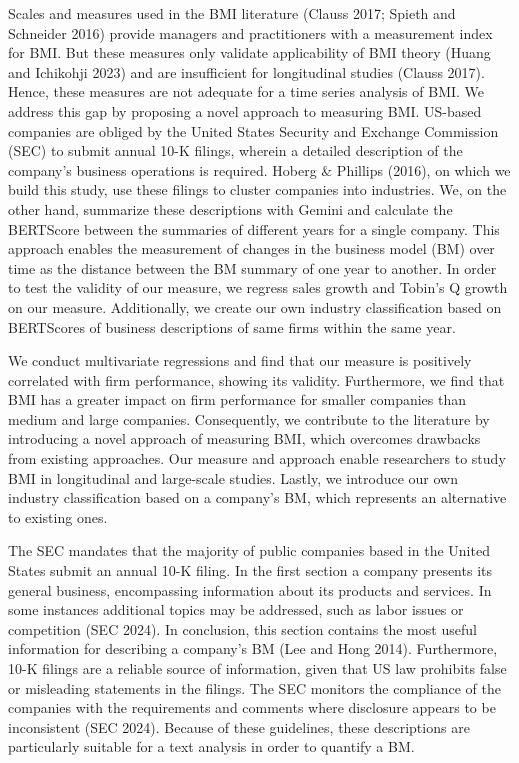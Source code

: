 \documentclass[
]{article}
\begin{document}
Scales and measures used in the BMI literature (Clauss 2017; Spieth and
Schneider 2016) provide managers and practitioners with a measurement
index for BMI. But these measures only validate applicability of BMI
theory (Huang and Ichikohji 2023) and are insufficient for longitudinal
studies (Clauss 2017). Hence, these measures are not adequate for a time
series analysis of BMI. We address this gap by proposing a novel
approach to measuring BMI. US-based companies are obliged by the United
States Security and Exchange Commission (SEC) to submit annual 10-K
filings, wherein a detailed description of the company's business
operations is required. Hoberg \& Phillips (2016), on which we build
this study, use these filings to cluster companies into industries. We,
on the other hand, summarize these descriptions with Gemini and
calculate the BERTScore between the summaries of different years for a
single company. This approach enables the measurement of changes in the
business model (BM) over time as the distance between the BM summary of
one year to another. In order to test the validity of our measure, we
regress sales growth and Tobin's Q growth on our measure. Additionally,
we create our own industry classification based on BERTScores of
business descriptions of same firms within the same year.

We conduct multivariate regressions and find that our measure is
positively correlated with firm performance, showing its validity.
Furthermore, we find that BMI has a greater impact on firm performance
for smaller companies than medium and large companies. Consequently, we
contribute to the literature by introducing a novel approach of
measuring BMI, which overcomes drawbacks from existing approaches. Our
measure and approach enable researchers to study BMI in longitudinal and
large-scale studies. Lastly, we introduce our own industry
classification based on a company's BM, which represents an alternative
to existing ones.

The SEC mandates that the majority of public companies based in the
United States submit an annual 10-K filing. In the first section a
company presents its general business, encompassing information about
its products and services. In some instances additional topics may be
addressed, such as labor issues or competition (SEC 2024). In
conclusion, this section contains the most useful information for
describing a company's BM (Lee and Hong 2014). Furthermore, 10-K filings
are a reliable source of information, given that US law prohibits false
or misleading statements in the filings. The SEC monitors the compliance
of the companies with the requirements and comments where disclosure
appears to be inconsistent (SEC 2024). Because of these guidelines,
these descriptions are particularly suitable for a text analysis in
order to quantify a BM.
\end{document}
